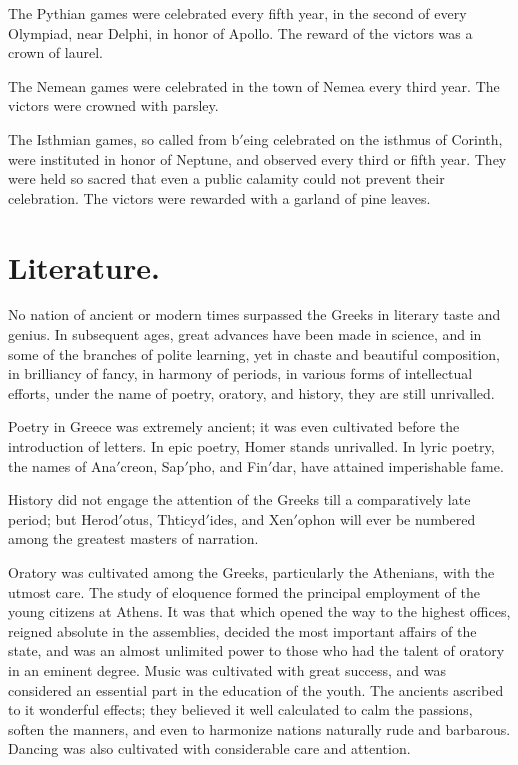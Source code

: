 \documentclass[openany,a4paper]{memoir}
\begin{document}
The Pythian games were celebrated every fifth year, in the 
second of every Olympiad, near Delphi, in honor of Apollo. 
The reward of the victors was a crown of laurel. 

The Nemean games were celebrated in the town of Nemea 
every third year. The victors were crowned with parsley. 

The Isthmian games, so called from b$'$eing celebrated on 
the isthmus of Corinth, were instituted in honor of Neptune, 
and observed every third or fifth year. They were held so 
sacred that even a public calamity could not prevent their 
celebration. The victors were rewarded with a garland of 
pine leaves. 

\section{Literature.}

No nation of ancient or modern times surpassed the Greeks in literary taste and genius. In subsequent ages, great advances have been made in science, and in 
some of the branches of polite learning, yet in chaste and 
beautiful composition, in brilliancy of fancy, in harmony of 
periods, in various forms of intellectual efforts, under the 
name of poetry, oratory, and history, they are still unrivalled. 

Poetry in Greece was extremely ancient; it was even cultivated before the introduction of letters. In epic poetry, 
Homer stands unrivalled. In lyric poetry, the names of 
Ana$'$creon, Sap$'$pho, and Fin$'$dar, have attained imperishable fame. 

History did not engage the attention of the Greeks till a 
comparatively late period; but Herod$'$otus, Thticyd$'$ides, and 
Xen$'$ophon will ever be numbered among the greatest masters of narration. 

Oratory was cultivated among the Greeks, particularly the 
Athenians, with the utmost care. The study of eloquence 
formed the principal employment of the young citizens at 
Athens. It was that which opened the way to the highest 
offices, reigned absolute in the assemblies, decided the most 
important affairs of the state, and was an almost unlimited 
power to those who had the talent of oratory in an eminent 
degree. Music was cultivated with great success, and was 
considered an essential part in the education of the youth. 
The ancients ascribed to it wonderful effects; they believed 
it well calculated to calm the passions, soften the manners, 
and even to harmonize nations naturally rude and barbarous. 
Dancing was also cultivated with considerable care and attention. 
\end{document}
